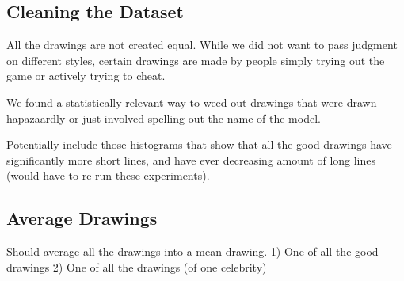 \subsection{Cleaning the Dataset}
All the drawings are not created equal. While we did not want to pass judgment on different styles, certain drawings are made by people simply trying out the game or actively trying to cheat.

We found a statistically relevant way to weed out drawings that were drawn hapazaardly or just involved spelling out the name of the model.

Potentially include those histograms that show that all the good drawings have significantly more short lines, and have ever decreasing amount of long lines (would have to re-run these experiments).

\subsection{Average Drawings}
Should average all the drawings into a mean drawing.
1) One of all the good drawings
2) One of all the drawings (of one celebrity)
